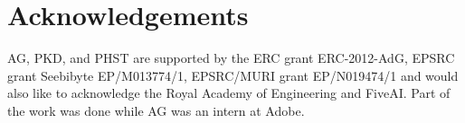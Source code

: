 \documentclass[10pt,twocolumn,letterpaper]{article}
\begin{document}


% 







\section*{Acknowledgements}
\noindent AG, PKD, and PHST are supported by the ERC grant ERC-2012-AdG, EPSRC grant Seebibyte EP/M013774/1, EPSRC/MURI grant EP/N019474/1 and would also like to acknowledge the Royal Academy of Engineering and FiveAI. Part of the work was done while AG was an intern at Adobe.



{\small


}

% 
\end{document}
